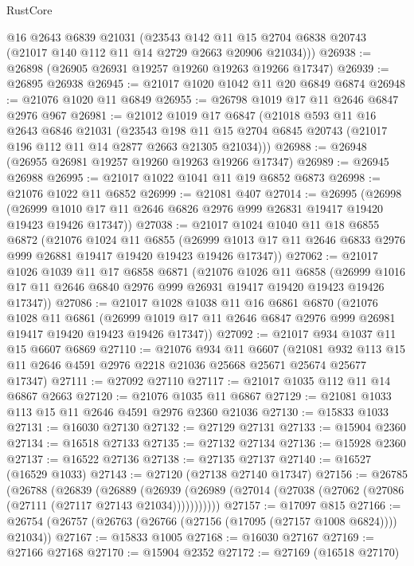 \begin{lexlean}{RustCore}
\begin{coremodule}
      @16
      @2643
      @6839
      @21031
      (@23543 @142 @11 @15 @2704 @6838 @20743 (@21017 @140 @112 @11 @14 @2729 @2663 @20906 @21034)))
@26938 := @26898 (@26905 @26931 @19257 @19260 @19263 @19266 @17347)
@26939 := @26895 @26938
@26945 := @21017 @1020 @1042 @11 @20 @6849 @6874
@26948 := @21076 @1020 @11 @6849
@26955 := @26798 @1019 @17 @11 @2646 @6847 @2976 @967
@26981 := @21012
    @1019
    @17
    @6847
    (@21018
      @593
      @11
      @16
      @2643
      @6846
      @21031
      (@23543 @198 @11 @15 @2704 @6845 @20743 (@21017 @196 @112 @11 @14 @2877 @2663 @21305 @21034)))
@26988 := @26948 (@26955 @26981 @19257 @19260 @19263 @19266 @17347)
@26989 := @26945 @26988
@26995 := @21017 @1022 @1041 @11 @19 @6852 @6873
@26998 := @21076 @1022 @11 @6852
@26999 := @21081 @407
@27014 := @26995
    (@26998 (@26999 @1010 @17 @11 @2646 @6826 @2976 @999 @26831 @19417 @19420 @19423 @19426 @17347))
@27038 := @21017
    @1024
    @1040
    @11
    @18
    @6855
    @6872
    (@21076
      @1024
      @11
      @6855
      (@26999 @1013 @17 @11 @2646 @6833 @2976 @999 @26881 @19417 @19420 @19423 @19426 @17347))
@27062 := @21017
    @1026
    @1039
    @11
    @17
    @6858
    @6871
    (@21076
      @1026
      @11
      @6858
      (@26999 @1016 @17 @11 @2646 @6840 @2976 @999 @26931 @19417 @19420 @19423 @19426 @17347))
@27086 := @21017
    @1028
    @1038
    @11
    @16
    @6861
    @6870
    (@21076
      @1028
      @11
      @6861
      (@26999 @1019 @17 @11 @2646 @6847 @2976 @999 @26981 @19417 @19420 @19423 @19426 @17347))
@27092 := @21017 @934 @1037 @11 @15 @6607 @6869
@27110 := @21076
    @934
    @11
    @6607
    (@21081 @932 @113 @15 @11 @2646 @4591 @2976 @2218 @21036 @25668 @25671 @25674 @25677 @17347)
@27111 := @27092 @27110
@27117 := @21017 @1035 @112 @11 @14 @6867 @2663
@27120 := @21076 @1035 @11 @6867
@27129 := @21081 @1033 @113 @15 @11 @2646 @4591 @2976 @2360 @21036
@27130 := @15833 @1033
@27131 := @16030 @27130
@27132 := @27129 @27131
@27133 := @15904 @2360
@27134 := @16518 @27133
@27135 := @27132 @27134
@27136 := @15928 @2360
@27137 := @16522 @27136
@27138 := @27135 @27137
@27140 := @16527 (@16529 @1033)
@27143 := @27120 (@27138 @27140 @17347)
@27156 := @26785
    (@26788
      (@26839
        (@26889
          (@26939 (@26989 (@27014 (@27038 (@27062 (@27086 (@27111 (@27117 @27143 @21034)))))))))))
@27157 := @17097 @815
@27166 := @26754 (@26757 (@26763 (@26766 (@27156 (@17095 (@27157 @1008 @6824)))) @21034))
@27167 := @15833 @1005
@27168 := @16030 @27167
@27169 := @27166 @27168
@27170 := @15904 @2352
@27172 := @27169 (@16518 @27170)

\end{coremodule}
\end{lexlean}

